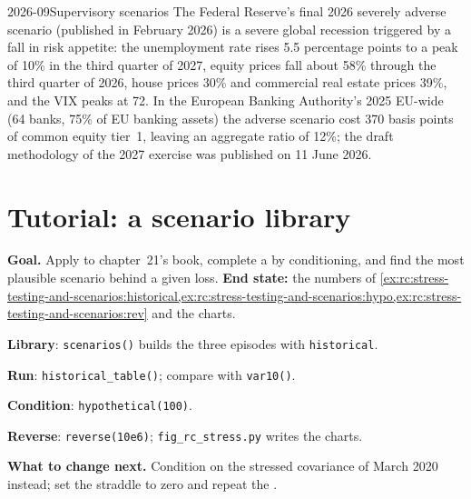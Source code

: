\begin{dated}{2026-09}{Supervisory scenarios}\label{dat:rc:stress-testing-and-scenarios:fed}
The Federal Reserve's final 2026 severely adverse scenario (published in February 2026) is a severe
global recession triggered by a fall in risk appetite: the unemployment rate rises 5.5 percentage
points to a peak of 10\% in the third quarter of 2027, equity prices fall about 58\% through the
third quarter of 2026, house prices 30\% and commercial real estate prices 39\%, and the VIX peaks at
72. In the European Banking Authority's 2025 EU-wide  (64 banks, 75\% of EU banking assets) the
adverse scenario cost 370 basis points of common equity tier~1, leaving an aggregate ratio of 12\%; the
draft methodology of the 2027 exercise was published on 11 June 2026.
\end{dated}

\section{Tutorial: a scenario library}\label{tut:rc:stress-testing-and-scenarios:tutorial}

\begin{tutorial}
\textbf{Goal.} Apply  to chapter~21's book, complete a  by
conditioning, and find the most plausible scenario behind a given loss. \textbf{End state:} the
numbers of
\cref{ex:rc:stress-testing-and-scenarios:historical,ex:rc:stress-testing-and-scenarios:hypo,ex:rc:stress-testing-and-scenarios:rev}
and the charts.
\begin{tutsteps}
\item \textbf{Library}: \texttt{scenarios()} builds the three episodes with \texttt{historical}.
\item \textbf{Run}: \texttt{historical\_table()}; compare with \texttt{var10()}.
\item \textbf{Condition}: \texttt{hypothetical(100)}.
\item \textbf{Reverse}: \texttt{reverse(10e6)}; \texttt{fig\_rc\_stress.py} writes the charts.
\end{tutsteps}
\textbf{What to change next.} Condition on the stressed covariance of March 2020 instead; set the
straddle to zero and repeat the .
\end{tutorial}

